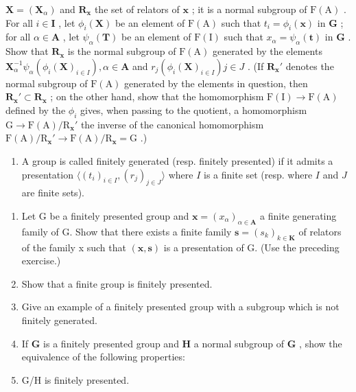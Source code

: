 \(\mathbf{X} = (\mathbf{X}_{\alpha})\) and \(\mathbf{R}_{\mathbf{x}}\) the set of relators of \(\mathbf{x}\) ; it is a normal subgroup of \(\mathrm{F(A)}\) . For all \(i \in \mathbf{I}\) , let \(\phi_i(\mathbf{X})\) be an element of \(\mathrm{F(A)}\) such that \(t_i = \phi_i(\mathbf{x})\) in \(\mathbf{G}\) ; for all \(\alpha \in \mathbf{A}\) , let \(\psi_{\alpha}(\mathbf{T})\) be an element of \(\mathrm{F(I)}\) such that \(x_{\alpha} = \psi_{\alpha}(\mathbf{t})\) in \(\mathbf{G}\) . Show that \(\mathbf{R}_{\mathbf{x}}\) is the normal subgroup of \(\mathrm{F(A)}\) generated by the elements \(\mathbf{X}_{\alpha}^{-1} \psi_{\alpha}(\phi_i(\mathbf{X})_{i \in I}), \alpha \in \mathbf{A}\) and \(r_j(\phi_i(\mathbf{X})_{i \in I}) j \in J\) . (If \(\mathbf{R}_{\mathbf{x}}'\) denotes the normal subgroup of \(\mathrm{F(A)}\) generated by the elements in question, then \(\mathbf{R}_{\mathbf{x}}' \subset \mathbf{R}_{\mathbf{x}}\) ; on the other hand, show that the homomorphism \(\mathrm{F(I)} \to \mathrm{F(A)}\) defined by the \(\phi_i\) gives, when passing to the quotient, a homomorphism \(\mathrm{G} \to \mathrm{F(A)} / \mathrm{R}_{\mathbf{x}}'\) the inverse of the canonical homomorphism \(\mathrm{F(A)} / \mathrm{R}_{\mathbf{x}}' \to \mathrm{F(A)} / \mathrm{R}_{\mathbf{x}} = \mathrm{G}\) .)

\begin{enumerate}
\def\labelenumi{\arabic{enumi}.}
\setcounter{enumi}{15}
\tightlist
\item
  A group is called finitely generated (resp. finitely presented) if it admits a presentation \(\langle (t_i)_{i\in I}, (r_j)_{j\in J}\rangle\) where \(I\) is a finite set (resp. where \(I\) and \(J\) are finite sets).
\end{enumerate}

\begin{enumerate}
\def\labelenumi{(\alph{enumi})}
\item
  Let G be a finitely presented group and \(\mathbf{x} = (x_{\alpha})_{\alpha \in \mathbf{A}}\) a finite generating family of G. Show that there exists a finite family \(\mathbf{s} = (s_{k})_{k \in \mathbf{K}}\) of relators of the family x such that \((\mathbf{x}, \mathbf{s})\) is a presentation of G. (Use the preceding exercise.)
\item
  Show that a finite group is finitely presented.
\item
  Give an example of a finitely presented group with a subgroup which is not finitely generated.
\item
  If \(\mathbf{G}\) is a finitely presented group and \(\mathbf{H}\) a normal subgroup of \(\mathbf{G}\) , show the equivalence of the following properties:
\item
  G/H is finitely presented.
\end{enumerate}

